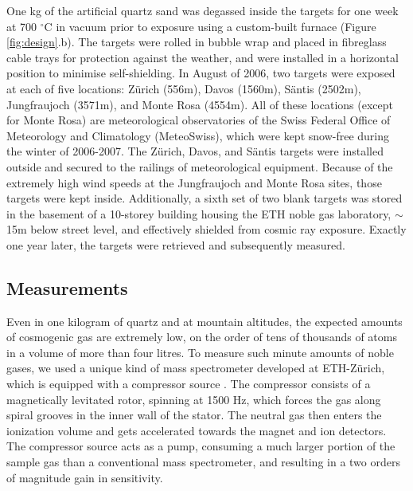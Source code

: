 \documentclass{article}
\begin{document}
One kg of  the artificial quartz sand was  degassed inside the targets
for one  week at 700 $^{\circ}$C  in vacuum prior to  exposure using a
custom-built  furnace (Figure  \ref{fig:design}.b).  The  targets were
rolled  in  bubble wrap  and  placed  in  fibreglass cable  trays  for
protection  against the weather,  and were  installed in  a horizontal
position to  minimise self-shielding.  In August of  2006, two targets
were  exposed at  each  of five  locations:  Z\"{u}rich (556m),  Davos
(1560m),  S\"{a}ntis  (2502m), Jungfraujoch  (3571m),  and Monte  Rosa
(4554m).   All  of  these   locations  (except  for  Monte  Rosa)  are
meteorological   observatories  of   the  Swiss   Federal   Office  of
Meteorology  and Climatology (MeteoSwiss),  which were  kept snow-free
during the winter of 2006-2007.  The Z\"{u}rich, Davos, and S\"{a}ntis
targets  were  installed  outside  and  secured  to  the  railings  of
meteorological equipment.   Because of the extremely  high wind speeds
at  the Jungfraujoch  and Monte  Rosa sites,  those targets  were kept
inside.  Additionally, a sixth set  of two blank targets was stored in
the  basement  of a  10-storey  building  housing  the ETH  noble  gas
laboratory,  $\sim$15m below  street level,  and  effectively shielded
from cosmic  ray exposure.  Exactly  one year later, the  targets were
retrieved and subsequently measured.

\subsection{Measurements}\label{sec:measurements}

Even in one kilogram of quartz and at mountain altitudes, the expected
amounts of cosmogenic  gas are extremely low, on the  order of tens of
thousands of  atoms in a volume  of more than four  litres. To measure
such minute  amounts of  noble gases,  we used a  unique kind  of mass
spectrometer  developed at  ETH-Z\"{u}rich, which  is equipped  with a
compressor  source  \citep{baur1999}.  The  compressor  consists of  a
magnetically levitated  rotor, spinning at  1500 Hz, which  forces the
gas along spiral grooves in the inner wall of the stator.  The neutral
gas then enters the ionization volume and gets accelerated towards the
magnet  and ion  detectors.  The  compressor  source acts  as a  pump,
consuming a much larger portion  of the sample gas than a conventional
mass spectrometer, and resulting in  a two orders of magnitude gain in
sensitivity.  \\
\end{document}

